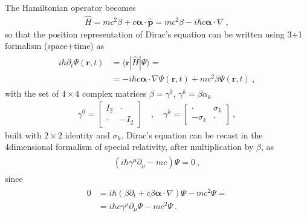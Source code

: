 \documentclass[letterpaper,10pt,english]{jupyterBook}
\begin{document}
\sphinxAtStartPar
The Hamiltonian operator becomes
\begin{equation*}
\begin{split}\hat{H} = m c^2 \beta + c \boldsymbol\alpha \cdot \hat{\mathbf{p}} = m c^2 \beta - i \hbar c \boldsymbol\alpha \cdot \nabla \ , \end{split}
\end{equation*}
\sphinxAtStartPar
so that the position representation of Dirac’s equation can be written using 3+1 formalism (space+time) as
\begin{equation*}
\begin{split}\begin{aligned}
  i \hbar \partial_t \Psi(\mathbf{r},t) 
  & = \langle \mathbf{r} | \hat{H} | \Psi \rangle = \\
  & = - i \hbar c \boldsymbol\alpha \cdot \nabla \Psi(\mathbf{r},t) + m c^2 \beta \Psi(\mathbf{r},t) \ ,
\end{aligned}\end{split}
\end{equation*}
\sphinxAtStartPar
with the set of \(4 \times 4\) complex matrices \(\beta = \gamma^0\), \(\gamma^k = \beta \alpha_k\)
\begin{equation*}
\begin{split}
  \gamma^0 = \begin{bmatrix} I_2 & \cdot \\ \cdot & -I_2 \end{bmatrix}
  \quad , \quad
  \gamma^k = \begin{bmatrix} \cdot & \sigma_k \\ -\sigma_k & \cdot \end{bmatrix} \ ,
\end{split}
\end{equation*}
\sphinxAtStartPar
built with \(2 \times 2\) identity and {\hyperref[\detokenize{ch/quantum-mechanics/angular-momentum/angular-momentum-spin:quantum-mechanics-angular-momentum-spin-pauli-matrices}]{}} \(\sigma_k\). Dirac’s equation can be recast in the 4\sphinxhyphen{}dimensional formalism of special relativity, after multiplication by \(\beta\), as
\begin{equation*}
\begin{split}\begin{aligned}
 \left( i \hbar \gamma^\mu \partial_\mu - m c \right) \Psi = 0 \ ,
\end{aligned}\end{split}
\end{equation*}
\sphinxAtStartPar
since
\begin{equation*}
\begin{split}\begin{aligned}
 0
 & = i \hbar \left( \beta \partial_t + c \beta \boldsymbol\alpha \cdot \nabla \right) \Psi - m c^2 \Psi = \\
 & = i \hbar c \gamma^\mu \partial_\mu \Psi - m c^2 \Psi \ .
\end{aligned}\end{split}
\end{equation*}
\end{document}
